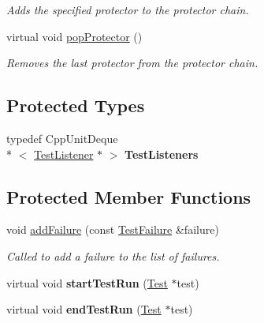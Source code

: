 \begin{DoxyCompactItemize}
\begin{DoxyCompactList}\small\item\em Adds the specified protector to the protector chain. \end{DoxyCompactList}\item 
\hypertarget{class_test_result_acfbbc6037e1af423f93cdb0360076524}{virtual void \hyperlink{class_test_result_acfbbc6037e1af423f93cdb0360076524}{pop\-Protector} ()}\label{class_test_result_acfbbc6037e1af423f93cdb0360076524}

\begin{DoxyCompactList}\small\item\em Removes the last protector from the protector chain. \end{DoxyCompactList}\end{DoxyCompactItemize}
\subsection*{Protected Types}
\begin{DoxyCompactItemize}
\item 
\hypertarget{class_test_result_a781741f5636cab07026c43e141781d19}{typedef Cpp\-Unit\-Deque\\*
$<$ \hyperlink{class_test_listener}{Test\-Listener} $\ast$ $>$ {\bfseries Test\-Listeners}}\label{class_test_result_a781741f5636cab07026c43e141781d19}

\end{DoxyCompactItemize}
\subsection*{Protected Member Functions}
\begin{DoxyCompactItemize}
\item 
\hypertarget{class_test_result_aa423474527cbc89141763ea41336a188}{void \hyperlink{class_test_result_aa423474527cbc89141763ea41336a188}{add\-Failure} (const \hyperlink{class_test_failure}{Test\-Failure} \&failure)}\label{class_test_result_aa423474527cbc89141763ea41336a188}

\begin{DoxyCompactList}\small\item\em Called to add a failure to the list of failures. \end{DoxyCompactList}\item 
\hypertarget{class_test_result_a6263b1ca50fa6bf504332e181bf75670}{virtual void {\bfseries start\-Test\-Run} (\hyperlink{class_test}{Test} $\ast$test)}\label{class_test_result_a6263b1ca50fa6bf504332e181bf75670}

\item 
\hypertarget{class_test_result_a9721fc94b9991cfd3efde322701ebf70}{virtual void {\bfseries end\-Test\-Run} (\hyperlink{class_test}{Test} $\ast$test)}\label{class_test_result_a9721fc94b9991cfd3efde322701ebf70}

\end{DoxyCompactItemize}
